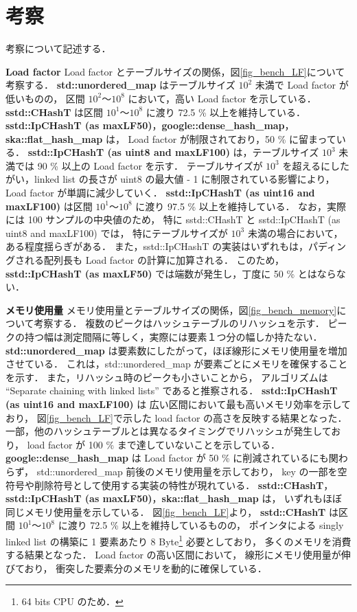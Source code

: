 \chapter{考察}
\label{chap_Discussion}

考察について記述する．
\leavevmode \newline

%
{\bf Load factor}
\samepage\newline\indent
Load factor とテーブルサイズの関係，図\ref{fig_bench_LF}について考察する．
{\bf std::unordered\_map} はテーブルサイズ $10^2$ 未満で Load factor が低いものの，
区間 $10^2〜10^8$ において，高い Load factor を示している．
{\bf sstd::CHashT} は区間 $10^1〜10^8$ に渡り 72.5 \% 以上を維持している．
{\bf sstd::IpCHashT (as maxLF50)}，{\bf google::dense\_hash\_map}，{\bf ska::flat\_hash\_map} は，
Load factor が制限されており，50 \% に留まっている．
{\bf sstd::IpCHashT (as uint8 and maxLF100)} は，テーブルサイズ $10^3$ 未満では 90 \% 以上の Load factor を示す．
テーブルサイズが $10^3$ を超えるにしたがい，linked list の長さが uint8 の最大値 - 1 に制限されている影響により，
Load factor が単調に減少していく．
{\bf sstd::IpCHashT (as uint16 and maxLF100)} は区間 $10^1〜10^8$ に渡り 97.5 \% 以上を維持している．
なお，実際には 100 サンプルの中央値のため，
特に sstd::CHashT と sstd::IpCHashT (as uint8 and maxLF100) では，
特にテーブルサイズが $10^3$ 未満の場合において，ある程度揺らぎがある．
また，sstd::IpCHashT の実装はいずれもは，パディングされる配列長も Load factor の計算に加算される．
このため，{\bf sstd::IpCHashT (as maxLF50)} では端数が発生し，丁度に 50 \% とはならない．
\leavevmode \newline

%
{\bf メモリ使用量}
\samepage\newline\indent
メモリ使用量とテーブルサイズの関係，図\ref{fig_bench_memory}について考察する．
複数のピークはハッシュテーブルのリハッシュを示す．
ピークの持つ幅は測定間隔に等しく，実際には要素１つ分の幅しか持たない．
{\bf std::unordered\_map} は要素数にしたがって，ほぼ線形にメモリ使用量を増加させている．
これは，std::unordered\_map が要素ごとにメモリを確保することを示す．
また，リハッシュ時のピークも小さいことから，
アルゴリズムは ``Separate chaining with linked lists'' であると推察される．
{\bf sstd::IpCHashT (as uint16 and maxLF100)} は
広い区間において最も高いメモリ効率を示しており，
図\ref{fig_bench_LF}で示した load factor の高さを反映する結果となった．
一部，他のハッシュテーブルとは異なるタイミングでリハッシュが発生しており，
load factor が 100 \% まで達していないことを示している．
{\bf google::dense\_hash\_map} は
Load factor が 50 \% に削減されているにも関わらず，
std::unordered\_map 前後のメモリ使用量を示しており，
key の一部を空符号や削除符号として使用する実装の特性が現れている．
{\bf sstd::CHashT}，{\bf sstd::IpCHashT (as maxLF50)}，{\bf ska::flat\_hash\_map} は，
いずれもほぼ同じメモリ使用量を示している．
図\ref{fig_bench_LF}より，
{\bf sstd::CHashT} は区間 $10^1〜10^8$ に渡り 72.5 \% 以上を維持しているものの，
ポインタによる singly linked list の構築に 1 要素あたり 8 Byte\footnote{64 bits CPU のため．} 必要としており，
多くのメモリを消費する結果となった．
Load factor の高い区間において，
線形にメモリ使用量が伸びており，
衝突した要素分のメモリを動的に確保している．


